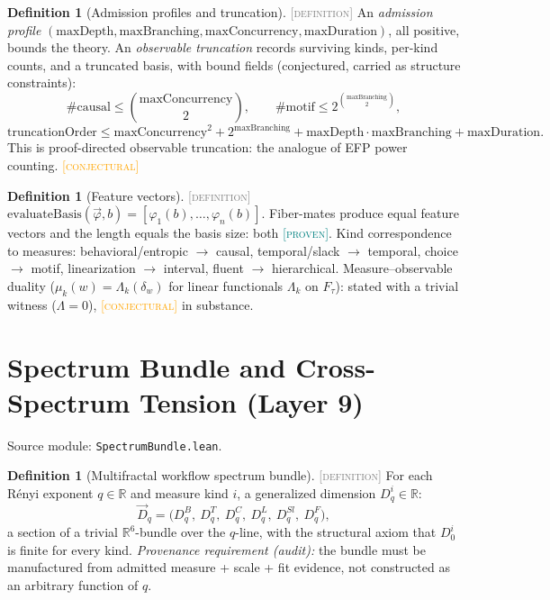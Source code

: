 \documentclass[11pt]{article}
\newcommand{\PROVEN}{\textcolor{teal}{\textsc{[proven]}}}
\newcommand{\DEFINITION}{\textcolor{gray}{\textsc{[definition]}}}
\newcommand{\CONJECTURAL}{\textcolor{orange}{\textsc{[conjectural]}}}
\newcommand{\tmap}{\tau}                       %
\newcommand{\R}{\mathbb{R}}
\theoremstyle{plain}
\theoremstyle{definition}
\newtheorem{definition}[theorem]{Definition}
\begin{document}
\begin{definition}[Admission profiles and truncation]\DEFINITION\;
An \emph{admission profile}
$(\mathrm{maxDepth}, \mathrm{maxBranching}, \mathrm{maxConcurrency},
\mathrm{maxDuration})$, all positive, bounds the theory. An
\emph{observable truncation} records surviving kinds, per-kind counts, and a
truncated basis, with bound fields (conjectured, carried as structure
constraints):
\[
  \#\mathrm{causal} \le \binom{\mathrm{maxConcurrency}}{2},
  \qquad
  \#\mathrm{motif} \le 2^{\binom{\mathrm{maxBranching}}{2}},
\]
\[
  \mathrm{truncationOrder} \le
  \mathrm{maxConcurrency}^2 + 2^{\mathrm{maxBranching}}
  + \mathrm{maxDepth}\cdot\mathrm{maxBranching} + \mathrm{maxDuration}.
\]
This is proof-directed observable truncation: the analogue of EFP power
counting. \CONJECTURAL
\end{definition}

\begin{definition}[Feature vectors]\DEFINITION\;
$\mathrm{evaluateBasis}(\vec{\varphi}, b) = [\varphi_1(b), \dots,
\varphi_n(b)]$. Fiber-mates produce equal feature vectors and the length
equals the basis size: both \PROVEN. Kind correspondence to measures:
behavioral/entropic $\to$ causal, temporal/slack $\to$ temporal, choice
$\to$ motif, linearization $\to$ interval, fluent $\to$ hierarchical.
Measure--observable duality ($\mu_k(w) = \Lambda_k(\delta_w)$ for linear
functionals $\Lambda_k$ on $F_\tmap$): stated with a trivial witness
($\Lambda = 0$), \CONJECTURAL{} in substance.
\end{definition}

\section{Spectrum Bundle and Cross-Spectrum Tension (Layer 9)}
\label{sec:spectrum}
Source module: \texttt{SpectrumBundle.lean}.

\begin{definition}[Multifractal workflow spectrum bundle]\DEFINITION\;
For each R\'enyi exponent $q \in \R$ and measure kind $i$, a generalized
dimension $D_q^i \in \R$:
\[
  \vec{D}_q = \big(D_q^{B},\ D_q^{T},\ D_q^{C},\ D_q^{L},\ D_q^{Sl},\ D_q^{F}\big),
\]
a section of a trivial $\R^{6}$-bundle over the $q$-line, with the
structural axiom that $D_0^{i}$ is finite for every kind.
\emph{Provenance requirement (audit):} the bundle must be manufactured from
admitted measure + scale + fit evidence, not constructed as an arbitrary
function of $q$.
\end{definition}
\end{document}

